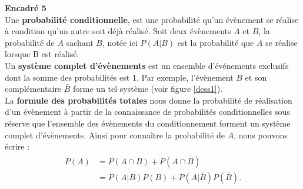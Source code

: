 \setlength{\columnsep}{1cm}
\begin{minipage}{0.9\linewidth}
\textbf{Encadré 5} \\
Une \textbf{probabilité conditionnelle}, est une probabilité qu'un évènement se réalise à condition qu'un autre soit déjà réalisé. Soit deux évènements $A$ et $B$, la probabilité de $A$ sachant $B$, notée ici $P(A|B)$ est la probabilité que $A$ se réalise lorsque B est réalisé. \\
Un \textbf{système complet d'évènements} est un ensemble d'événements exclusifs dont la somme des probabilités est 1. Par exemple, l'évènement $B$ et son complémentaire $\bar{B}$ forme un tel système (voir figure \ref{dess1}).\\
La \textbf{formule des probabilités totales} nous donne la probabilité de réalisation d'un évènement à partir de la connaissance de probabilités conditionnelles sous réserve que l'ensemble des évènements du conditionnement forment un système complet d'évènements. Ainsi pour connaître la probabilité de $A$, nous pouvons écrire :
\begin{align*}
\begin{split}
P(A)&=P(A\cap B)+ P(A\cap\bar{B})\\
& =P(A|B)P(B)+P(A|\bar{B})P(\bar{B}).\end{split} \end{align*}

\end{minipage}
